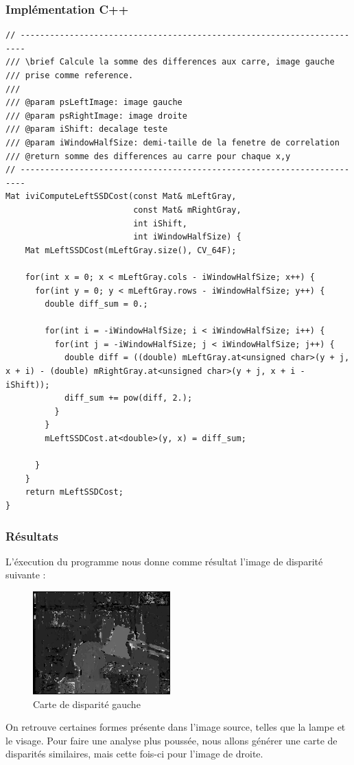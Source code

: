 \documentclass[a4paper]{article}
\begin{document}
\subsubsection{Implémentation C++}
\begin{lstlisting}
// -----------------------------------------------------------------------
/// \brief Calcule la somme des differences aux carre, image gauche
/// prise comme reference.
///
/// @param psLeftImage: image gauche
/// @param psRightImage: image droite
/// @param iShift: decalage teste
/// @param iWindowHalfSize: demi-taille de la fenetre de correlation
/// @return somme des differences au carre pour chaque x,y
// -----------------------------------------------------------------------
Mat iviComputeLeftSSDCost(const Mat& mLeftGray,
                          const Mat& mRightGray,
                          int iShift,
                          int iWindowHalfSize) {
    Mat mLeftSSDCost(mLeftGray.size(), CV_64F);

    for(int x = 0; x < mLeftGray.cols - iWindowHalfSize; x++) {
      for(int y = 0; y < mLeftGray.rows - iWindowHalfSize; y++) {
        double diff_sum = 0.;

        for(int i = -iWindowHalfSize; i < iWindowHalfSize; i++) {
          for(int j = -iWindowHalfSize; j < iWindowHalfSize; j++) {
            double diff = ((double) mLeftGray.at<unsigned char>(y + j, x + i) - (double) mRightGray.at<unsigned char>(y + j, x + i - iShift));
            diff_sum += pow(diff, 2.);
          }
        }
        mLeftSSDCost.at<double>(y, x) = diff_sum;

      }
    }
    return mLeftSSDCost;
}
\end{lstlisting}

\subsubsection{Résultats}

L'éxecution du programme nous donne comme résultat l'image de disparité suivante :
\begin{figure}[h]
\begin{center}
	\includegraphics[width=200px]{left-disparity_resampled.png}
\end{center}
\caption{Carte de disparité gauche}
\end{figure}
On retrouve certaines formes présente dans l'image source, telles que la lampe et le visage. Pour faire une analyse plus poussée, nous allons générer une carte de disparités similaires, mais cette fois-ci pour l'image de droite.
\end{document}
